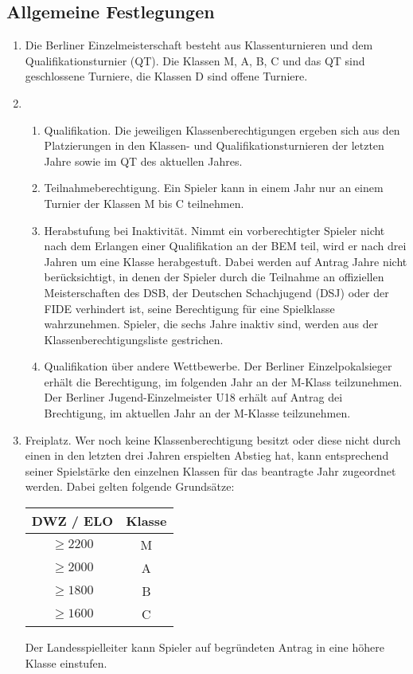 \documentclass[fontsize=12pt, paper=a4, ngerman]{article}
\begin{document}
\subsection{Allgemeine Festlegungen}

\begin{enumerate}
\item Die Berliner Einzelmeisterschaft besteht aus Klassenturnieren und dem Qualifikationsturnier (QT). 
Die Klassen M, A, B, C und das QT sind geschlossene Turniere, die Klassen D sind offene Turniere.
\item
  \begin{enumerate}[label=\alph*.]
  \item Qualifikation. Die jeweiligen Klassenberechtigungen ergeben sich aus den Platzierungen in den Klassen- und Qualifikationsturnieren der letzten Jahre
  sowie im QT des aktuellen Jahres.
  \item Teilnahmeberechtigung. Ein Spieler kann in einem Jahr nur an einem Turnier der Klassen M bis C teilnehmen.
  \item Herabstufung bei Inaktivität. Nimmt ein vorberechtigter Spieler nicht nach dem Erlangen einer Qualifikation an der BEM teil, wird er nach drei Jahren um eine Klasse
  herabgestuft. Dabei werden auf Antrag Jahre nicht berücksichtigt, in denen der Spieler durch die Teilnahme an offiziellen Meisterschaften des DSB, der
  Deutschen Schachjugend (DSJ) oder der FIDE verhindert ist, seine Berechtigung für eine Spielklasse wahrzunehmen. Spieler, die sechs Jahre inaktiv sind, werden aus der
  Klassenberechtigungsliste gestrichen.
  \item Qualifikation über andere Wettbewerbe. Der Berliner Einzelpokalsieger erhält 
  die Berechtigung, im folgenden Jahr an der M-Klass teilzunehmen.
  Der Berliner Jugend-Einzelmeister U18 erhält auf Antrag dei Brechtigung, im aktuellen Jahr an der M-Klasse teilzunehmen.
  \end{enumerate}
\item Freiplatz. Wer noch keine Klassenberechtigung besitzt oder diese nicht durch einen in den letzten drei Jahren erspielten Abstieg hat, kann entsprechend
seiner Spielstärke den einzelnen Klassen für das beantragte Jahr zugeordnet werden. Dabei gelten folgende Grundsätze:

\begin{tabular}{c | c} 
DWZ / ELO & Klasse \\
\hline
$\ge 2200$ & M \\
$\ge 2000$ & A \\
$\ge 1800$ & B \\
$\ge 1600$ & C \\
\end{tabular}

Der Landesspielleiter kann Spieler auf begründeten Antrag in eine höhere Klasse einstufen.

\end{enumerate}
\end{document}
